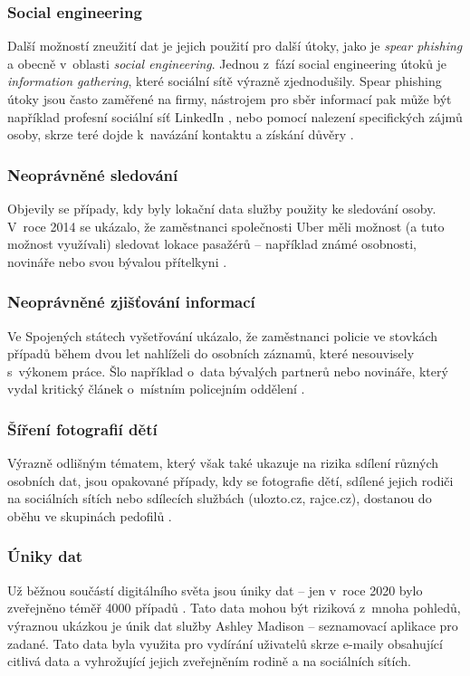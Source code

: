 \subsubsection*{Social engineering}
Další možností zneužití dat je jejich použití pro další útoky, jako je \textit{spear phishing} a obecně v~oblasti \textit{social engineering}. Jednou z~fází social engineering útoků je \textit{information gathering}\citep{social-engineering-definition}, které sociální sítě výrazně zjednodušily. Spear phishing útoky jsou často zaměřené na firmy, nástrojem pro sběr informací pak může být například profesní sociální síť LinkedIn \citep{social-engineering-tools}, nebo pomocí nalezení specifických zájmů osoby, skrze teré dojde k~navázání kontaktu a získání důvěry \citep{social-engineering-book}.

\subsubsection*{Neoprávněné sledování}
Objevily se případy, kdy byly lokační data služby použity ke sledování osoby. V~roce 2014 se ukázalo, že zaměstnanci společnosti Uber měli možnost (a tuto možnost využívali) sledovat lokace pasažérů -- například známé osobnosti, novináře nebo svou bývalou přítelkyni \citep{uber-spying}.

\subsubsection*{Neoprávněné zjišťování informací}
Ve Spojených státech vyšetřování ukázalo, že zaměstnanci policie ve stovkách případů během dvou let nahlíželi do osobních záznamů, které nesouvisely s~výkonem práce. Šlo například o~data bývalých partnerů nebo novináře, který vydal kritický článek o~místním policejním oddělení \citep{police-spying}. 

\subsubsection*{Šíření fotografií dětí}
Výrazně odlišným tématem, který však také ukazuje na rizika sdílení různých osobních dat, jsou opakované případy, kdy se fotografie dětí, sdílené jejich rodiči na sociálních sítích nebo sdílecích službách (ulozto.cz, rajce.cz), dostanou do oběhu ve skupinách pedofilů \citep{pedophiles-web}.

\subsubsection*{Úniky dat}
Už běžnou součástí digitálního světa jsou úniky dat -- jen v~roce 2020 bylo zveřejněno téměř 4000 případů \citep{data-breaches-2021}. Tato data mohou být riziková z~mnoha pohledů, výraznou ukázkou je únik dat služby Ashley Madison -- seznamovací aplikace pro zadané. Tato data byla využita pro vydírání uživatelů skrze e-maily obsahující citlivá data a vyhrožující jejich zveřejněním rodině a na sociálních sítích.\citep{ashley-madison-leak}


